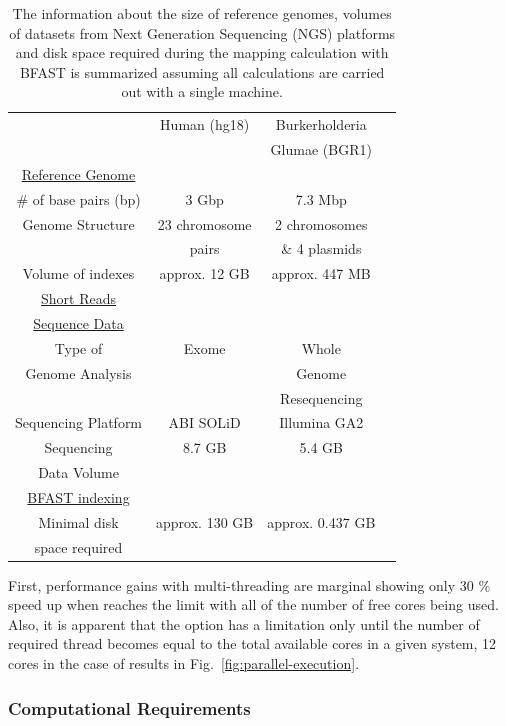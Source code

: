 \documentclass{acm_proc_article-sp}
\begin{document}
\begin{table}
\begin{tabular}{|c|c|c|c|} 
  \hline 
   & Human (hg18) & Burkerholderia   \\ 
& & Glumae (BGR1)\\   
   
   \hline
 \underline{Reference Genome} & &  \\
    \# of base pairs (bp) &  3 Gbp & 7.3 Mbp \\
   Genome Structure &   23 chromosome  & 2 chromosomes  \\  
   &   pairs & \& 4 plasmids \\
    Volume of indexes  & approx. 12 GB  & approx. 447 MB  \\
      \hline
    \underline{Short Reads} & &   \\
        \underline{Sequence Data}& &    \\
  Type of  &  Exome  & Whole \\
  
Genome Analysis  &  &  Genome \\
&& Resequencing \\
  Sequencing Platform & ABI SOLiD  &  Illumina GA2 \\
  Sequencing   & 8.7 GB & 5.4 GB \\
  Data Volume&&\\
  
  
  \hline
  \underline{BFAST indexing} & &  \\
  Minimal disk &  approx. 130 GB   &    approx. 0.437 GB   \\
space required & &\\
\hline
\end{tabular} \caption{The information about the size of reference genomes, volumes of datasets from
 Next Generation Sequencing (NGS) platforms and disk space required during the mapping calculation 
 with BFAST is summarized assuming all calculations are carried out with a single machine.}
 \label{table:two-genomes} 
\end{table}
First, performance gains with multi-threading are marginal showing only 30 \% speed up when reaches the 
limit with all of the number of free cores being used.  Also, it is apparent that the option has a limitation only
until the number of required thread becomes equal to the total available cores in a given system, 
12 cores in the case of results in Fig.~\ref{fig:parallel-execution}.

\subsubsection{Computational Requirements}
\end{document}
